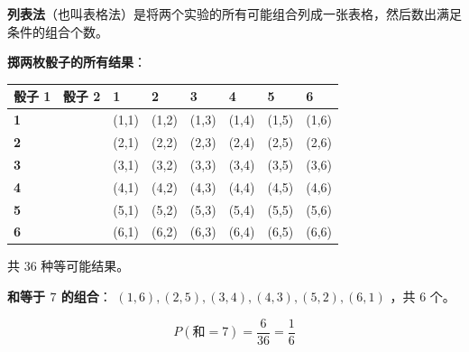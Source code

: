 \begin{understand}


\textbf{列表法}（也叫表格法）是将两个实验的所有可能组合列成一张表格，然后数出满足条件的组合个数。

\textbf{掷两枚骰子的所有结果}：

\begin{center}
\begin{tabular}{lllllll}
\toprule
骰子 1 \ 骰子 2 & 1 & 2 & 3 & 4 & 5 & 6 \\
\midrule
\textbf{1} & (1,1) & (1,2) & (1,3) & (1,4) & (1,5) & (1,6) \\
\textbf{2} & (2,1) & (2,2) & (2,3) & (2,4) & (2,5) & (2,6) \\
\textbf{3} & (3,1) & (3,2) & (3,3) & (3,4) & (3,5) & (3,6) \\
\textbf{4} & (4,1) & (4,2) & (4,3) & (4,4) & (4,5) & (4,6) \\
\textbf{5} & (5,1) & (5,2) & (5,3) & (5,4) & (5,5) & (5,6) \\
\textbf{6} & (6,1) & (6,2) & (6,3) & (6,4) & (6,5) & (6,6) \\
\bottomrule
\end{tabular}
\end{center}


共 $36$ 种等可能结果。

\textbf{和等于 $7$ 的组合}： $(1,6), (2,5), (3,4), (4,3), (5,2), (6,1)$ ，共 $6$ 个。

\[
P(\text{和} = 7) = \frac{6}{36} = \frac{1}{6}
\]


\end{understand}

